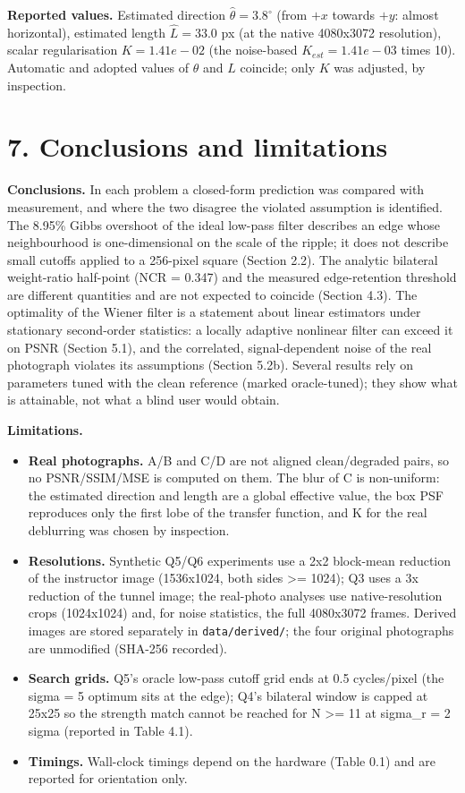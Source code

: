 \documentclass[10pt,a4paper]{article}
\begin{document}
\textbf{Reported values.} Estimated direction $\hat\theta=3.8^\circ$ (from $+x$ towards $+y$: almost horizontal), estimated length $\hat L=33.0$ px (at the native 4080x3072 resolution), scalar regularisation $K=1.41e-02$ (the noise-based $K_{est}=1.41e-03$ times 10). Automatic and adopted values of $\theta$ and $L$ coincide; only $K$ was adjusted, by inspection.

\section{7. Conclusions and limitations}
\textbf{Conclusions.} In each problem a closed-form prediction was compared with measurement, and where the two disagree the violated assumption is identified. The 8.95\% Gibbs overshoot of the ideal low-pass filter describes an edge whose neighbourhood is one-dimensional on the scale of the ripple; it does not describe small cutoffs applied to a 256-pixel square (Section 2.2). The analytic bilateral weight-ratio half-point (NCR = 0.347) and the measured edge-retention threshold are different quantities and are not expected to coincide (Section 4.3). The optimality of the Wiener filter is a statement about linear estimators under stationary second-order statistics: a locally adaptive nonlinear filter can exceed it on PSNR (Section 5.1), and the correlated, signal-dependent noise of the real photograph violates its assumptions (Section 5.2b). Several results rely on parameters tuned with the clean reference (marked oracle-tuned); they show what is attainable, not what a blind user would obtain.

\textbf{Limitations.}

\begin{itemize}\item \textbf{Real photographs.} A/B and C/D are not aligned clean/degraded pairs, so no PSNR/SSIM/MSE is computed on them. The blur of C is non-uniform: the estimated direction and length are a global effective value, the box PSF reproduces only the first lobe of the transfer function, and K for the real deblurring was chosen by inspection. \item \textbf{Resolutions.} Synthetic Q5/Q6 experiments use a 2x2 block-mean reduction of the instructor image (1536x1024, both sides \textgreater{}= 1024); Q3 uses a 3x reduction of the tunnel image; the real-photo analyses use native-resolution crops (1024x1024) and, for noise statistics, the full 4080x3072 frames. Derived images are stored separately in \texttt{data/\allowbreak{}derived/\allowbreak{}}; the four original photographs are unmodified (SHA-256 recorded). \item \textbf{Search grids.} Q5's oracle low-pass cutoff grid ends at 0.5 cycles/pixel (the sigma = 5 optimum sits at the edge); Q4's bilateral window is capped at 25x25 so the strength match cannot be reached for N \textgreater{}= 11 at sigma\_r = 2 sigma (reported in Table 4.1). \item \textbf{Timings.} Wall-clock timings depend on the hardware (Table 0.1) and are reported for orientation only. \end{itemize}
\end{document}
